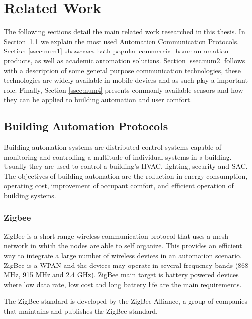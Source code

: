\chapter{Related Work}
\label{chapter:relatedwork}



The following sections detail the main related work researched in this thesis. In Section~\ref{ssec:num3} we explain the most used Automation Communication Protocols. Section \ref{ssec:num1} showcases both popular commercial home automation products, as well as academic automation solutions.
Section \ref{ssec:num2} follows with a description of some general purpose communication technologies, these technologies are widely available in mobile devices and as such play a important role.
 Finally, Section \ref{ssec:num4} presents commonly available sensors and how they can be applied to building automation and user comfort.



\section{Building Automation Protocols} \label{ssec:num3}

Building automation systems are distributed control systems capable of monitoring and controlling a multitude of individual systems in a building. Usually they are used to control a building's \ac{HVAC}, lighting, security and \ac{SAC}.
The objectives of building automation are the reduction in energy consumption, operating cost, improvement of occupant comfort, and efficient operation of building systems.

\subsection{Zigbee}\label{zigbee_sub}

ZigBee \cite{livro_zigbee} is a short-range wireless communication protocol that uses a mesh-network in which the nodes are able to self organize. This provides an efficient way to integrate a large number of wireless devices in an automation scenario. ZigBee is a \ac{WPAN} and the devices may operate in several frequency bands (868 MHz, 915 MHz and 2.4 GHz). ZigBee main target is battery powered devices where low data rate, low cost and long battery life are the main requirements.

The ZigBee standard is developed by the ZigBee Alliance, a group of companies that maintains and publishes the ZigBee standard. 

